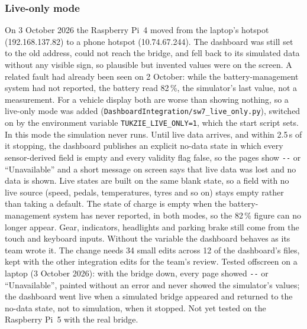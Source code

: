 \subsubsection*{Live-only mode}
\label{sec:live-only}
On 3 October 2026 the Raspberry Pi~4 moved from the laptop's hotspot (192.168.137.82) to a phone hotspot (10.74.67.244). The dashboard was still set to the old address, could not reach the bridge, and fell back to its simulated data without any visible sign, so plausible but invented values were on the screen. A related fault had already been seen on 2 October: while the battery-management system had not reported, the battery read 82\,\%, the simulator's last value, not a measurement. For a vehicle display both are worse than showing nothing, so a live-only mode was added (\texttt{DashboardIntegration/sw7\_live\_only.py}), switched on by the environment variable \texttt{TUKZIE\_LIVE\_ONLY=1}, which the start script sets. In this mode the simulation never runs. Until live data arrives, and within 2.5\,s of it stopping, the dashboard publishes an explicit no-data state in which every sensor-derived field is empty and every validity flag false, so the pages show \texttt{-{}-} or ``Unavailable'' and a short message on screen says that live data was lost and no data is shown. Live states are built on the same blank state, so a field with no live source (speed, pedals, temperatures, tyres and so on) stays empty rather than taking a default. The state of charge is empty when the battery-management system has never reported, in both modes, so the 82\,\% figure can no longer appear. Gear, indicators, headlights and parking brake still come from the touch and keyboard inputs. Without the variable the dashboard behaves as its team wrote it. The change needs 34 small edits across 12 of the dashboard's files, kept with the other integration edits for the team's review. Tested offscreen on a laptop (3 October 2026): with the bridge down, every page showed \texttt{-{}-} or ``Unavailable'', painted without an error and never showed the simulator's values; the dashboard went live when a simulated bridge appeared and returned to the no-data state, not to simulation, when it stopped. Not yet tested on the Raspberry Pi~5 with the real bridge.

